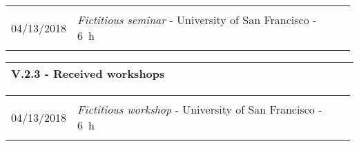 \documentclass[11pt, letterpaper]{extarticle}
\begin{document}
	\begin{longtable}{C{0.154\linewidth}C{0.834\linewidth}N}
		                                                             &                                                                                                                                                                                                                                                  & \\[-0.12cm]
		04/13/2018                                                   & \textit{Fictitious seminar} - University of San Francisco - 6~h                                                                                                                                                                                  & \\[0.40cm]
		                                                             &                                                                                                                                                                                                                                                  & \\[-0.12cm] \hline
	\end{longtable}


	\label{sec:V.2.3.}
	\begin{longtable}{L{1.012\linewidth}N}
		\textbf{\large V.2.3 - Received workshops} & \\[0.60cm] \hline
	\end{longtable}

	\begin{longtable}{C{0.154\linewidth}C{0.834\linewidth}N}
		                                                             &                                                                                                                                                                                                                                                  & \\[-0.12cm]
		04/13/2018                                                   & \textit{Fictitious workshop} - University of San Francisco - 6~h                                                                                                                                                                                 & \\[0.40cm]
		                                                             &                                                                                                                                                                                                                                                  & \\[-0.12cm] \hline
	\end{longtable}
\end{document}
